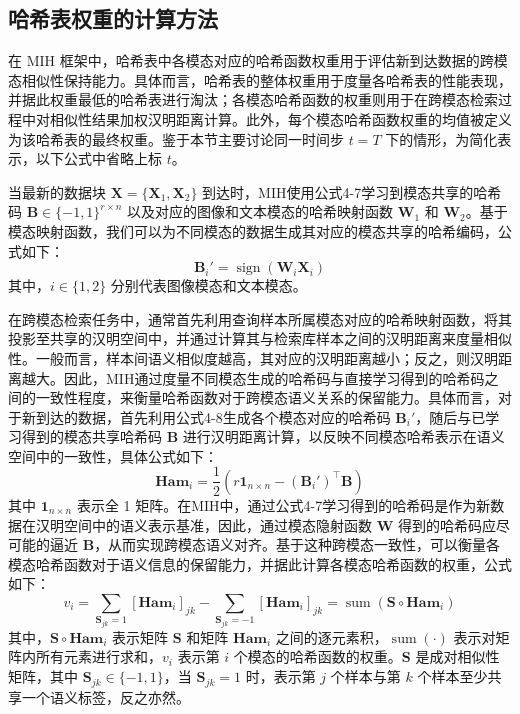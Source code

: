 \subsection{哈希表权重的计算方法}
在 MIH 框架中，哈希表中各模态对应的哈希函数权重用于评估新到达数据的跨模态相似性保持能力。具体而言，哈希表的整体权重用于度量各哈希表的性能表现，并据此权重最低的哈希表进行淘汰；各模态哈希函数的权重则用于在跨模态检索过程中对相似性结果加权汉明距离计算。此外，每个模态哈希函数权重的均值被定义为该哈希表的最终权重。鉴于本节主要讨论同一时间步 $t = T$ 下的情形，为简化表示，以下公式中省略上标 $t$。

当最新的数据块 $\mathbf{X}=\{\mathbf{X}_1, \mathbf{X}_2\}$ 到达时，MIH使用公式4-7学习到模态共享的哈希码 $\mathbf{B} \in \{-1,1\}^{r \times n}$ 以及对应的图像和文本模态的哈希映射函数 $\mathbf{W}_1$ 和 $\mathbf{W}_2$。基于模态映射函数，我们可以为不同模态的数据生成其对应的模态共享的哈希编码，公式如下：
\begin{equation}
  \mathbf{B}_i' = \operatorname{sign}(\mathbf{W}_i \mathbf{X}_i)
\end{equation}
其中，$i \in \{1,2\}$ 分别代表图像模态和文本模态。

在跨模态检索任务中，通常首先利用查询样本所属模态对应的哈希映射函数，将其投影至共享的汉明空间中，并通过计算其与检索库样本之间的汉明距离来度量相似性。一般而言，样本间语义相似度越高，其对应的汉明距离越小；反之，则汉明距离越大。因此，MIH通过度量不同模态生成的哈希码与直接学习得到的哈希码之间的一致性程度，来衡量哈希函数对于跨模态语义关系的保留能力。具体而言，对于新到达的数据，首先利用公式4-8生成各个模态对应的哈希码 $\mathbf{B}_i'$，随后与已学习得到的模态共享哈希码 $\mathbf{B}$ 进行汉明距离计算，以反映不同模态哈希表示在语义空间中的一致性，具体公式如下：
\begin{equation}
  \mathbf{Ham}_i = \frac{1}{2} (r \mathbf{1}_{n \times n} - (\mathbf{B}_i')^{\top} \mathbf{B})
\label{eq:mih-ham}
\end{equation}
其中 $\mathbf{1}_{n \times n}$ 表示全 1 矩阵。在MIH中，通过公式4-7学习得到的哈希码是作为新数据在汉明空间中的语义表示基准，因此，通过模态隐射函数 $\mathbf{W}$ 得到的哈希码应尽可能的逼近 $\mathbf{B}$，从而实现跨模态语义对齐。基于这种跨模态一致性，可以衡量各模态哈希函数对于语义信息的保留能力，并据此计算各模态哈希函数的权重，公式如下：
\begin{equation}
  v_i = \sum_{\mathbf{S}_{jk}=1} [\mathbf{Ham}_i]_{jk} - \sum_{\mathbf{S}_{jk}=-1} [\mathbf{Ham}_i]_{jk} = \operatorname{sum}(\mathbf{S} \circ \mathbf{Ham}_i)
\label{eq:mih-modal-weight}
\end{equation}
其中，$\mathbf{S} \circ \mathbf{Ham}_i$ 表示矩阵 $\mathbf{S}$ 和矩阵 $\mathbf{Ham}_i$ 之间的逐元素积，$\operatorname{sum}(\cdot)$ 表示对矩阵内所有元素进行求和，$v_i$ 表示第 $i$ 个模态的哈希函数的权重。$\mathbf{S}$ 是成对相似性矩阵，其中 $\mathbf{S}_{jk} \in \{-1,1\}$，当 $\mathbf{S}_{jk}=1$ 时，表示第 $j$ 个样本与第 $k$ 个样本至少共享一个语义标签，反之亦然。

